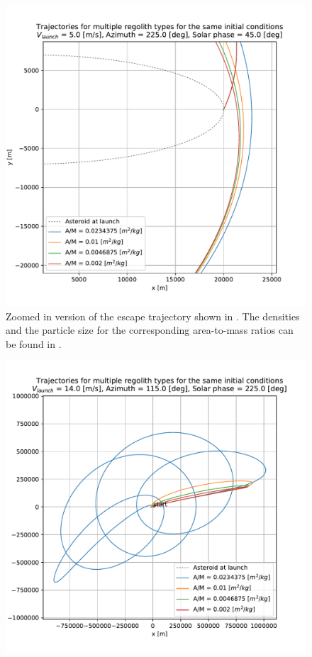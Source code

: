 \documentclass[print]{tudelft-report}
\begin{document}
\begin{appendices}
\begin{figure}[htb]
    \includegraphics[width=\textwidth, height=0.5\textheight, keepaspectratio=true]{Results/Images/longest_edge_perturbations/multiple_regolith_types/escape_traj_5ms_225Azim_45solarPhase_zoomed.pdf}
    \caption{Zoomed in version of the escape trajectory shown in . The densities and the particle size for the corresponding area-to-mass ratios can be found in .}
    \label{fig:escape_traj_allParticles_5ms_225Azim_45solarPhase_zoomed}
    \end{figure}
    \FloatBarrier
    \begin{figure}[htb]
    \centering
    \captionsetup{justification=centering}
    \includegraphics[width=\textwidth, height=0.4\textheight, keepaspectratio=true]{Results/Images/leading_edge_perturbations/reimpact_traj_14ms_115Azim_225solarPhase.pdf}

\end{figure}
\end{appendices}
\end{document}
